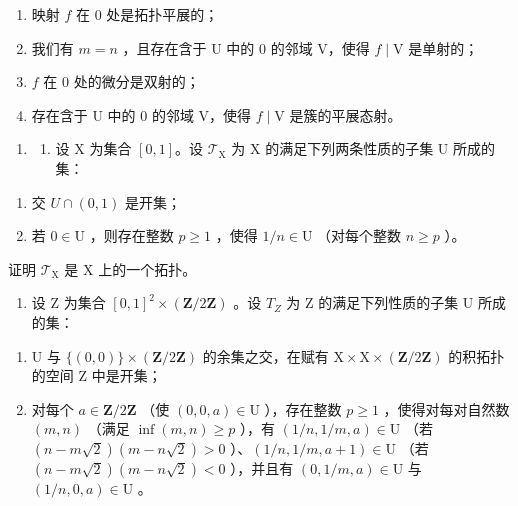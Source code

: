 \begin{enumerate}
\def\labelenumi{(\roman{enumi})}
\item
  映射 \(f\) 在 0 处是拓扑平展的；
\item
  我们有 \(m = n\) ，且存在含于 U 中的 0 的邻域 V，使得 \(f \mid \mathrm{V}\) 是单射的；
\item
  \(f\) 在 0 处的微分是双射的；
\item
  存在含于 U 中的 0 的邻域 V，使得 \(f \mid \mathrm{V}\) 是簇的平展态射。
\end{enumerate}

\begin{enumerate}
\def\labelenumi{\arabic{enumi})}
\setcounter{enumi}{6}
\tightlist
\item
  \begin{enumerate}
  \def\labelenumii{\alph{enumii})}
  \tightlist
  \item
    设 X 为集合 \([0,1]\)。设 \(\mathcal{T}_{\mathrm{X}}\) 为 X 的满足下列两条性质的子集 U 所成的集：
  \end{enumerate}
\end{enumerate}

\begin{enumerate}
\def\labelenumi{(\roman{enumi})}
\item
  交 \(U\cap(0,1)\) 是开集；
\item
  若 \(0 \in \mathrm{U}\) ，则存在整数 \(p \geqslant 1\) ，使得 \(1/n \in \mathrm{U}\) （对每个整数 \(n \geqslant p\) ）。
\end{enumerate}

证明 \(\mathcal{T}_{\mathrm{X}}\) 是 X 上的一个拓扑。

\begin{enumerate}
\def\labelenumi{\alph{enumi})}
\setcounter{enumi}{1}
\tightlist
\item
  设 Z 为集合 \([0,1]^{2} \times (\mathbf{Z}/2\mathbf{Z})\) 。设 \(T_{Z}\) 为 Z 的满足下列性质的子集 U 所成的集：
\end{enumerate}

\begin{enumerate}
\def\labelenumi{(\roman{enumi})}
\item
  U 与 \(\{(0,0)\} \times (\mathbf{Z}/2\mathbf{Z})\) 的余集之交，在赋有 \(\mathrm{X} \times \mathrm{X} \times (\mathbf{Z}/2\mathbf{Z})\) 的积拓扑的空间 Z 中是开集；
\item
  对每个 \(a \in \mathbf{Z}/2\mathbf{Z}\) （使 \((0,0,a) \in \mathrm{U}\) ），存在整数 \(p \geqslant 1\) ，使得对每对自然数 \((m,n)\) （满足 \(\inf(m,n) \geqslant p\) ），有 \((1/n,1/m,a) \in \mathrm{U}\) （若 \((n-m\sqrt{2})(m-n\sqrt{2}) > 0\) ）、\((1/n,1/m,a+1) \in \mathrm{U}\) （若 \((n-m\sqrt{2})(m-n\sqrt{2}) < 0\) ），并且有 \((0,1/m,a) \in \mathrm{U}\) 与 \((1/n,0,a) \in \mathrm{U}\) 。
\end{enumerate}

